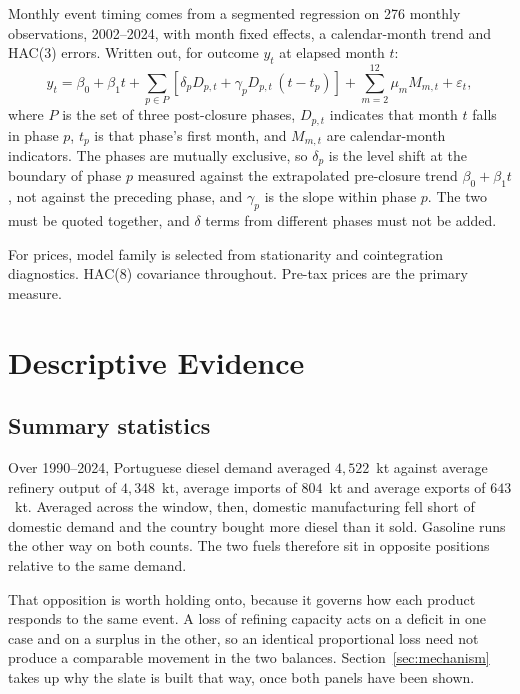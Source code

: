 \documentclass[11pt,a4paper]{article}
\begin{document}
Monthly event timing comes from a segmented regression \citep{wagner2002segmented,
bernal2017interrupted} on 276 monthly observations, 2002--2024,
with month fixed effects, a calendar-month trend and HAC(3) errors. Written out, for outcome
$y_t$ at elapsed month $t$:
\begin{equation}
y_t = \beta_0 + \beta_1 t + \sum_{p \in P} \left[ \delta_p D_{p,t}
  + \gamma_p D_{p,t}\,(t - t_p) \right] + \sum_{m=2}^{12} \mu_m M_{m,t} + \varepsilon_t ,
\label{eq:segmented}
\end{equation}
where $P$ is the set of three post-closure phases, $D_{p,t}$ indicates that month $t$ falls in
phase $p$, $t_p$ is that phase's first month, and $M_{m,t}$ are calendar-month indicators. The
phases are mutually exclusive, so $\delta_p$ is the level shift at the boundary of phase $p$
measured against the extrapolated pre-closure trend $\beta_0 + \beta_1 t$, not against the
preceding phase, and $\gamma_p$ is the slope within phase $p$. The two must be quoted together,
and $\delta$ terms from different phases must not be added.

For prices, model family is selected from stationarity and cointegration diagnostics. HAC(8)
covariance throughout. Pre-tax prices are the primary measure.

\section{Descriptive Evidence}

\subsection{Summary statistics}
\label{sec:summary}

Over 1990--2024, Portuguese diesel demand averaged $4{,}522$~kt against average refinery output
of $4{,}348$~kt, average imports of $804$~kt and average exports of $643$~kt. Averaged across
the window, then, domestic manufacturing fell short of domestic demand and the country bought
more diesel than it sold. Gasoline runs the other way on both counts. The two fuels therefore
sit in opposite positions relative to the same demand.

That opposition is worth holding onto, because it governs how each product responds to the
same event. A loss of refining capacity acts on a deficit in one case and on a surplus in the
other, so an identical proportional loss need not produce a comparable movement in the two
balances. Section~\ref{sec:mechanism} takes up why the slate is built that way, once both
panels have been shown.
\end{document}
